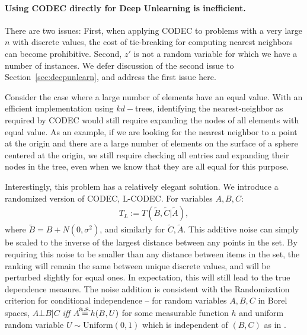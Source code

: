 

\paragraph{Using CODEC directly for Deep Unlearning is inefficient.} There are two issues: First, when applying CODEC to problems with a very large $n$ with discrete values, the cost of tie-breaking for computing nearest neighbors can become prohibitive. Second, $z'$ is not a random variable for which we have a number of instances. We defer discussion of the second issue  to Section~\ref{sec:deepunlearn}, and address the first issue here.

Consider the case where a large number of elements have an equal value. With an efficient implementation using $kd-$trees, identifying the nearest-neighbor as required by CODEC would still require expanding the nodes of all elements with equal value. As an example, if we are looking for the nearest neighbor to a point at the origin and there are a large number of elements on the surface of a sphere centered at the origin, we still require checking all entries and expanding their nodes in the tree, even when we know that they are all equal for this purpose.

Interestingly, this problem has a relatively elegant solution.
We introduce a randomized version of CODEC, L-CODEC. For variables $A,B,C$:
\begin{align}\label{eq:lcodec}
T_L := T\left(\tilde{B}, \tilde{C} | \tilde{A} \right),
\end{align}
where $\tilde{B} = B + N(0,\sigma^2)$, and similarly for $\tilde{C}, \tilde{A}$.
This additive noise can simply be scaled to the inverse of the largest distance between any points in the set.
By requiring this noise to be smaller than any distance between items in the set, the ranking will remain the same between unique discrete values, and will be perturbed slightly for equal ones.
In expectation, this will still lead to the true dependence measure. The noise addition is consistent with the Randomization criterion for conditional independence -- for random variables $A, B, C$ in Borel spaces, $A\bot B | C$ \textit{iff} $A \myas h(B, U)$ for some measurable function $h$ and uniform random variable $U \sim \text{Uniform}(0,1)$ which is independent of $(B,C)$ as in \cite{ptheory}. 


